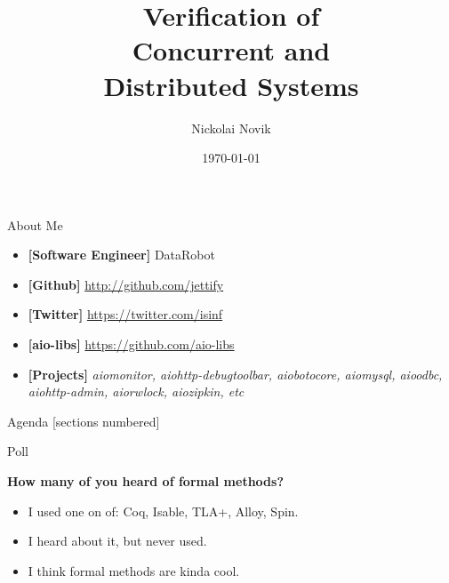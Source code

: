 \documentclass[12pt]{beamer}
\title{Verification of \\ Concurrent and \\ Distributed Systems}
\date{\today}
\author{Nickolai Novik}
\institute{\href{http://github.com/jettify}{http://github.com/jettify}}
\begin{document}
  \maketitle
  \begin{frame}{About Me}
    \begin{itemize}
        \item \textbf{[Software Engineer]}  DataRobot
        \item \textbf{[Github]}
            \href{http://github.com/jettify}{http://github.com/jettify}
        \item \textbf{[Twitter]}
            \href{https://twitter.com/isinf}{https://twitter.com/isinf}
        \item \textbf{[aio-libs]}
            \href{https://github.com/aio-libs}{https://github.com/aio-libs}
        \item \textbf{[Projects]}
            \textit{aiomonitor, aiohttp-debugtoolbar,
          aiobotocore, aiomysql, aioodbc, aiohttp-admin, aiorwlock,
          aiozipkin, etc}
    \end{itemize}
  \end{frame}
  \begin{frame}[squeeze]{Agenda}
      [sections numbered]
      \tableofcontents
  \end{frame}
  \begin{frame}{Poll}
      \begin{large}
          \textbf{How many of you heard of formal methods?}
      \end{large}
      \begin{itemize}
          \item I used one on of: Coq, Isable, TLA+, Alloy, Spin.
          \item I heard about it, but never used.
          \item I think formal methods are kinda cool.
      \end{itemize}
  \end{frame}
\end{document}
